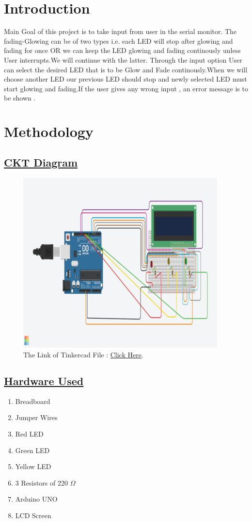 \documentclass[a4paper]{article}
\begin{document}
\section{Introduction}

Main Goal of this project is to take input from user in the serial monitor. The fading-Glowing can be of two types i.e. each LED will stop after glowing and fading for once OR we can keep the LED glowing and fading continously unless User interrupts.We will continue with the latter. Through the input option User can select the desired LED that is to be Glow and Fade continously.When we will choose another LED our previous LED should stop and newly selected LED must start glowing and fading.If the user gives any wrong input , an error message is to be shown .


\section{Methodology}
\subsection{\underline{CKT Diagram}}
\begin{figure}[h]
    \includegraphics{ard.png}
    The Link of Tinkercad File : \href{https://www.tinkercad.com/things/hc84ooOnekb-cool-bigery-lahdi/editel?tenant=circuits}{Click Here}.
\end{figure}

\newpage
\subsection{\underline{Hardware Used}}
\begin{enumerate}
    \item Breadboard
    \item Jumper Wires
    \item Red LED
    \item Green LED
    \item Yellow LED
    \item  3 Resistors of 220 $\Omega$
    \item Arduino UNO
    \item LCD Screen
\end{enumerate}
\end{document}
